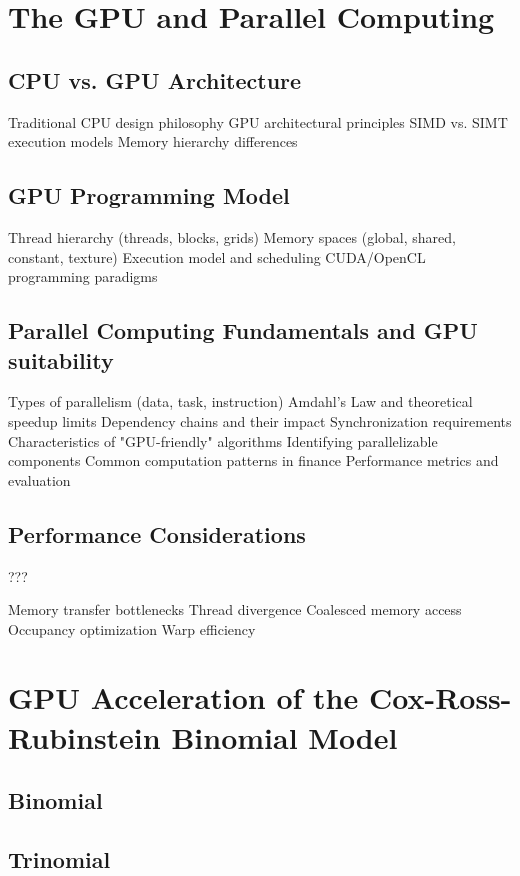 \documentclass[english,12pt,a4paper,pdftex,sci,utf8]{aaltothesis}
\begin{document}
\section{The GPU and Parallel Computing} \label{sec:gpu-computing}
\subsection{CPU vs. GPU Architecture}

Traditional CPU design philosophy
GPU architectural principles
SIMD vs. SIMT execution models
Memory hierarchy differences

\subsection{GPU Programming Model}

Thread hierarchy (threads, blocks, grids)
Memory spaces (global, shared, constant, texture)
Execution model and scheduling
CUDA/OpenCL programming paradigms

\subsection{Parallel Computing Fundamentals and GPU suitability}

Types of parallelism (data, task, instruction)
Amdahl's Law and theoretical speedup limits
Dependency chains and their impact
Synchronization requirements
Characteristics of "GPU-friendly" algorithms
Identifying parallelizable components
Common computation patterns in finance
Performance metrics and evaluation

\subsection{Performance Considerations} ???

Memory transfer bottlenecks
Thread divergence
Coalesced memory access
Occupancy optimization
Warp efficiency

\clearpage

\section{GPU Acceleration of the Cox-Ross-Rubinstein Binomial Model} \label{sec:gpu-crr}
\subsection{Binomial}
\subsection{Trinomial}
\end{document}
